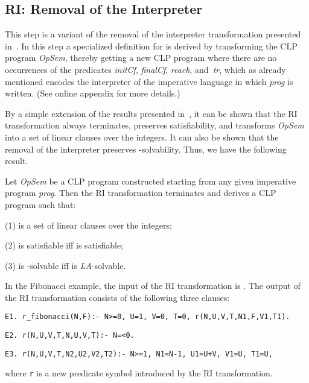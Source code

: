 \documentclass[english]{tlp}
\newcommand{\tts}{\tt \small}
\begin{document}
\subsection{{\bf{RI:}} Removal of the Interpreter}
\label{subsec:removal}


This step is a variant of the  {removal of the interpreter}
transformation presented in~\cite{De&14c}.
In this step a specialized definition for   is derived
by transforming the CLP program \textit{OpSem}, thereby getting a new
CLP program  where there are
no occurrences of the predicates {\it initCf}, {\it finalCf},
{\it reach}, and~{\it tr}, which as already mentioned 
encodes the interpreter of the imperative language in 
which {\it prog} is written.
(See online appendix for more details.)

By a simple extension of the results presented in~\cite{De&14c},
it can be shown that the RI transformation always terminates, 
preserves satisfiability, and transforms \textit{OpSem} into a set of
linear clauses over the integers.
It can also be shown that the removal of the interpreter preserves 
\mbox{-solvability.} 
	Thus, we have the following result.


\vspace{-.5mm}
\begin{theorem}
Let \textit{OpSem} be a CLP program constructed starting from any given 
imperative program \textit{prog}.\label{thm:RI}
Then the RI transformation terminates and derives a CLP program  such that:

\noindent
(1)  is a set of linear clauses over the integers;

\noindent
(2)  is satisfiable iff 
 is satisfiable;

\noindent
(3)  is 
-solvable iff  is {\textit{LA}}-solvable.
\end{theorem}

\noindent
In the Fibonacci example, the input of the
RI transformation is . 
The output of the
RI transformation consists of the following three clauses:

{\small{
\noindent
{\tt{E1.~r\_fibonacci(N,F):- N>=0,\,U=1,\,V=0,\,T=0,\,r(N,U,V,T,N1,F,V1,T1).}}\rule{0mm}{3.5mm}

\noindent
{\tt{E2.~r(N,U,V,T,N,U,V,T):- N=<0.}}


\noindent
{\tt{E3.~r(N,U,V,T,N2,U2,V2,T2):- N>=1,\,N1=N-1,\,U1=U+V,\,V1=U,\,T1=U,}}


}} \noindent
where {\tts r} is a new predicate symbol introduced by the
RI transformation.
\end{document}
